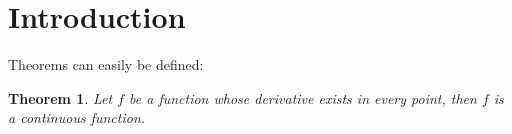\documentclass{article}
\newtheorem{theorem}{Theorem}
\begin{document}
	
	\section{Introduction}
	Theorems can easily be defined:
	
	\begin{theorem}
		Let \(f\) be a function whose derivative exists in every point, then \(f\) 
		is a continuous function.
	\end{theorem}
\end{document}
